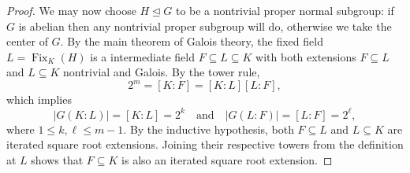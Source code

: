 \documentclass[12pt]{article}
\theoremstyle{definition}
\newcommand{\isp}[1]{\quad\text{#1}\quad}
\newcommand{\<}{\langle}
\renewcommand{\>}{\rangle}
\newcommand{\seq}{\subseteq}
\newcommand{\teq}{\trianglelefteq}
\begin{document}
\begin{proof}
    We may now choose $H \teq G$ to be a nontrivial proper normal subgroup: if $G$ is abelian then any nontrivial proper subgroup will do, otherwise we take the center of $G$.
    By the main theorem of Galois theory, the fixed field $L = \operatorname{Fix}_K(H)$ is a intermediate field $F \seq L \seq K$ with both extensions $F \seq L$ and $L \seq K$ nontrivial and Galois.
    By the tower rule,
    \[
        2^m = [K : F] = [K : L][L : F],
    \]
    which implies
    \[
        |G(K : L)| = [K : L] = 2^{k}
        \isp{and}
        |G(L : F)| = [L : F] = 2^\ell,
    \]
    where $1 \leq k, \ell \leq m - 1$.
    By the inductive hypothesis, both $F \seq L$ and $L \seq K$ are iterated square root extensions.
    Joining their respective towers from the definition at $L$ shows that $F \seq K$ is also an iterated square root extension.
\end{proof}
\end{document}
